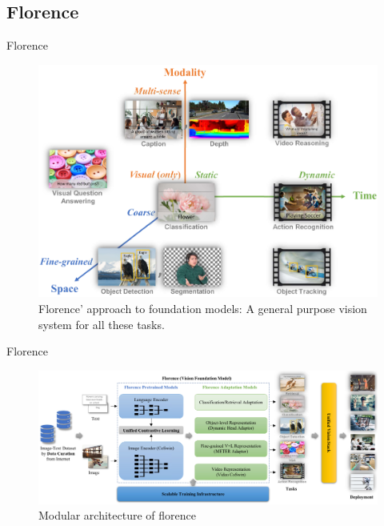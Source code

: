 \documentclass[xcolor=dvipsnames]{beamer}
\begin{document}
\subsection{Florence}
\begin{frame}{Florence \parencite{yuan2021florence}}
  \begin{figure}[ht]
    \centering
    \includegraphics[width=0.7\linewidth]{../../figures/02-04-text-support-img/florence-dimensions}
    \caption{Florence' approach to foundation models: A general purpose vision system for all these tasks.}
  \end{figure}
\end{frame}

\begin{frame}{Florence \parencite{yuan2021florence}}
  \begin{figure}[ht]
    \centering
    \includegraphics[width=1\linewidth]{../../figures/02-04-text-support-img/florence-architecture}
    \caption{Modular architecture of florence}
  \end{figure}
\end{frame}
\end{document}
